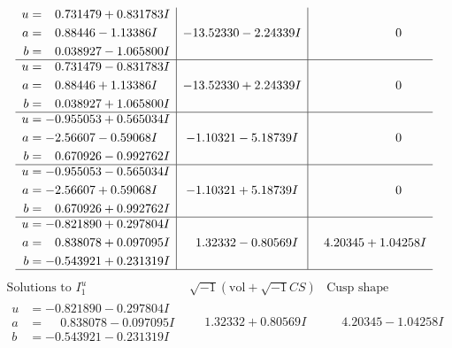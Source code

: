 \documentclass[1p]{elsarticle_modified}
\theoremstyle{definition}
\newcommand{\I}{\sqrt{-1}}
\begin{document}
$$\begin{array}{c|c|c}
\begin{aligned}
u &= \phantom{-}0.731479 + 0.831783 I \\
a &= \phantom{-}0.88446 - 1.13386 I \\
b &= \phantom{-}0.038927 - 1.065800 I\end{aligned}
 & -13.52330 - 2.24339 I & \phantom{-0.000000 } 0 \\ \hline\begin{aligned}
u &= \phantom{-}0.731479 - 0.831783 I \\
a &= \phantom{-}0.88446 + 1.13386 I \\
b &= \phantom{-}0.038927 + 1.065800 I\end{aligned}
 & -13.52330 + 2.24339 I & \phantom{-0.000000 } 0 \\ \hline\begin{aligned}
u &= -0.955053 + 0.565034 I \\
a &= -2.56607 - 0.59068 I \\
b &= \phantom{-}0.670926 - 0.992762 I\end{aligned}
 & -1.10321 - 5.18739 I & \phantom{-0.000000 } 0 \\ \hline\begin{aligned}
u &= -0.955053 - 0.565034 I \\
a &= -2.56607 + 0.59068 I \\
b &= \phantom{-}0.670926 + 0.992762 I\end{aligned}
 & -1.10321 + 5.18739 I & \phantom{-0.000000 } 0 \\ \hline\begin{aligned}
u &= -0.821890 + 0.297804 I \\
a &= \phantom{-}0.838078 + 0.097095 I \\
b &= -0.543921 + 0.231319 I\end{aligned}
 & \phantom{-}1.32332 - 0.80569 I & \phantom{-}4.20345 + 1.04258 I\\
 \hline 
 \end{array}$$\newpage$$\begin{array}{c|c|c}  
\text{Solutions to }I^u_{1}& \I (\text{vol} + \sqrt{-1}CS) & \text{Cusp shape}\\
 \hline 
\begin{aligned}
u &= -0.821890 - 0.297804 I \\
a &= \phantom{-}0.838078 - 0.097095 I \\
b &= -0.543921 - 0.231319 I\end{aligned}
 & \phantom{-}1.32332 + 0.80569 I & \phantom{-}4.20345 - 1.04258 I \\ \hline\begin{aligned}

\end{aligned}
\end{array}$$
\end{document}
